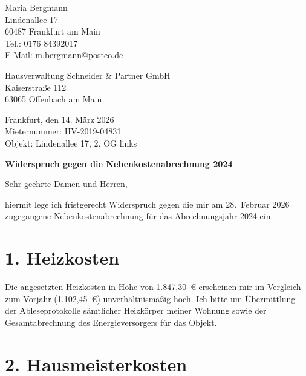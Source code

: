\documentclass[a4paper,11pt]{article}
\begin{document}
\begin{flushright}
Maria Bergmann\\
Lindenallee 17\\
60487 Frankfurt am Main\\[0.3cm]
Tel.: 0176 84392017\\
E-Mail: m.bergmann@posteo.de
\end{flushright}

\vspace{0.5cm}

\begin{flushleft}
Hausverwaltung Schneider \& Partner GmbH\\
Kaiserstra\ss e 112\\
63065 Offenbach am Main
\end{flushleft}

\vspace{0.5cm}

\begin{flushright}
Frankfurt, den 14. M\"arz 2026\\[0.3cm]
Mieternummer: HV-2019-04831\\
Objekt: Lindenallee 17, 2. OG links
\end{flushright}

\vspace{0.5cm}

\textbf{Widerspruch gegen die Nebenkostenabrechnung 2024}

\vspace{0.5cm}

Sehr geehrte Damen und Herren,

hiermit lege ich fristgerecht Widerspruch gegen die mir am 28.~Februar 2026 zugegangene Nebenkostenabrechnung f\"ur das Abrechnungsjahr 2024 ein.

\section*{1. Heizkosten}

Die angesetzten Heizkosten in H\"ohe von 1.847,30~\euro{} erscheinen mir im Vergleich zum Vorjahr (1.102,45~\euro{}) unverhältnism\"a\ss ig hoch. Ich bitte um \"Ubermittlung der Ableseprotokolle s\"amtlicher Heizk\"orper meiner Wohnung sowie der Gesamtabrechnung des Energieversorgers f\"ur das Objekt.

\section*{2. Hausmeisterkosten}
\end{document}
